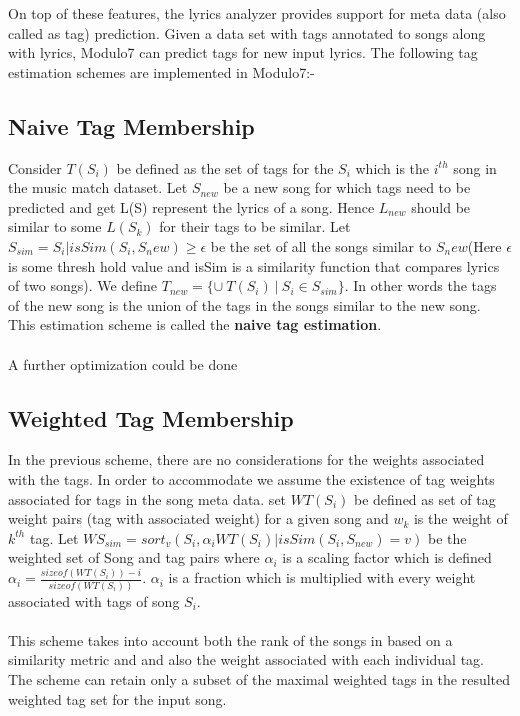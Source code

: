 \noindent On top of these features, the lyrics analyzer provides support for meta data (also called as tag) prediction. Given a data set with tags annotated to songs along with lyrics, Modulo7 can predict tags for new input lyrics. The following tag estimation schemes are implemented in Modulo7:-

\subsection{Naive Tag Membership}

\noindent Consider $T(S_i)$ be defined as the set of tags for the $S_i$ which is the $i^{th}$ song in the music match dataset. Let $S_{new}$ be a new song for which tags need to be predicted and get L(S) represent the lyrics of a song. Hence $L_{new}$ should be similar to some $L(S_k)$ for their tags to be similar. Let $S_{sim} = {S_i | isSim(S_i, S_new) \geq \epsilon} $ be the set of all the songs similar to $S_new$(Here $\epsilon$ is some thresh hold value and isSim is a similarity function that compares lyrics of two songs). We define $T_{new} = \{\cup \ T(S_i) \ | \ S_i \in S_{sim}\}$. In other words the tags of the new song is the union of the tags in the songs similar to the new song. This estimation scheme is called the \textbf{naive tag estimation}. \\\\
A further optimization could be done 

\subsection{Weighted Tag Membership}

\noindent In the previous scheme, there are no considerations for the weights associated with the tags. In order to accommodate we assume the existence of tag weights associated for tags in the song meta data. 
set $WT(S_i)$ be defined as set of tag weight pairs (tag with associated weight) for a given song and $w_k$ is the weight of $k^{th}$ tag. Let $WS_{sim} = sort_v({S_i, \alpha_i WT(S_i) | isSim(S_i, S_{new}) = v})$ be the weighted set of Song and tag pairs where $\alpha_i$ is a scaling factor which is defined $\alpha_i = \frac{sizeof(WT(S_i)) - i}{sizeof(WT(S_i))}$. $\alpha_i$ is a fraction which is multiplied with every weight associated with tags of song $S_i$. \\\\
This scheme takes into account both the rank of the songs in based on a similarity metric and and also the weight associated with each individual tag. The scheme can retain only a subset of the maximal weighted tags in the resulted weighted tag set for the input song.

